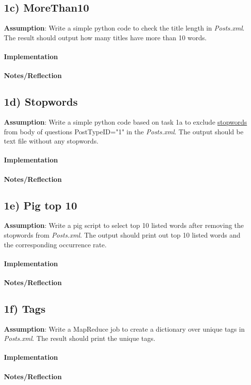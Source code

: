 \documentclass[fleqn,10pt]{wlscirep}
\begin{document}
\subsection*{1c) MoreThan10}
\textbf{Assumption}: Write a simple python code to check the title length in \textit{Posts.xml}. The result should output how many titles have more than 10 words.  \\ \\
\textbf{Implementation}  \\ \\
\textbf{Notes/Reflection}


\subsection*{1d) Stopwords}
\textbf{Assumption}: Write a simple python code based on task 1a to exclude \href{https://raw.githubusercontent.com/naimdjon/stopwords/master/stopwords.txt}{stopwords} from body of questions PostTypeID="1" in the \textit{Posts.xml}. The output should be text file without any stopwords. \\ \\
\textbf{Implementation}  \\ \\
\textbf{Notes/Reflection}



\subsection*{1e) Pig top 10}
\textbf{Assumption}: Write a pig script to select top 10 listed words after removing the stopwords from \textit{Posts.xml}. The output should print out top 10 listed words and the corresponding occurrence rate.\\ \\
\textbf{Implementation}  \\ \\
\textbf{Notes/Reflection}


\subsection*{1f) Tags}
\textbf{Assumption}: Write a MapReduce job to create a dictionary over unique tags in  \textit{Posts.xml}. The result should print the unique tags.\\ \\
\textbf{Implementation}  \\ \\
\textbf{Notes/Reflection}

\end{document}
